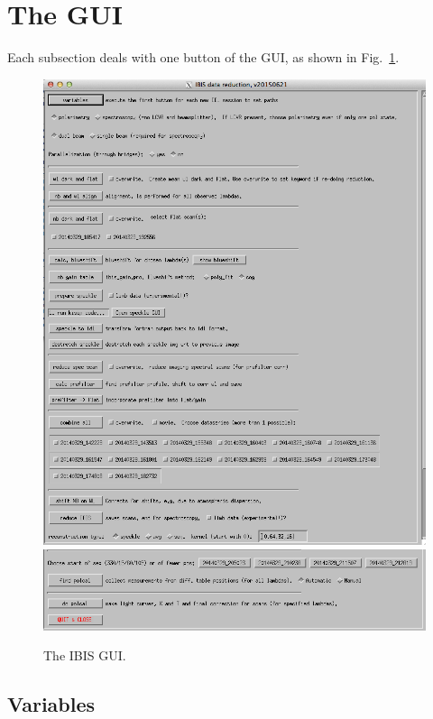 \documentclass[a4paper,12pt]{article}
\begin{document}
\section{The GUI}
\label{sec:gui}
Each subsection deals with one button of the GUI, as shown in Fig.~\ref{figgui}.

\begin{figure}[!htb]
\includegraphics[width=\textwidth]{ibis2.png}
\includegraphics[width=\textwidth]{ibis3.png}
\caption{The IBIS GUI.\label{figgui}}
\end{figure}


\subsection{Variables}
\end{document}
